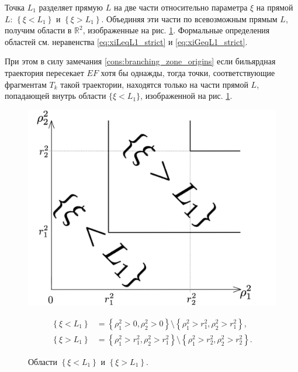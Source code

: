 \medskip

Точка $L_1$ разделяет прямую $L$ на две части относительно параметра $\xi$ на прямой $L$: $\left\{\xi < L_1\right\}$ и $\left\{\xi > L_1\right\}$. 
Объединяя эти части по всевозможным прямым $L$, получим области в $\mathbb{R}^2$, изображенные на  рис. \ref{fig:pt10:_lineDomains_simple}. Формальные определения областей см. неравенства \eqref{eq:xiLeqL1_strict} и \eqref{eq:xiGeqL1_strict}.

При этом в силу замечания \ref{cons:branching_zone_origins} если бильярдная траектория пересекает $EF$ хотя бы однажды, тогда точки, соответствующие фрагментам $T_k$ такой траектории, находятся только на части прямой $L$, попадающей внутрь области $\{ \xi < L_1\}$, изображенной на рис. \ref{fig:pt10:_lineDomains_simple}.

\begin{figure}[!htb]
    \begin{minipage}[c]{0.4\textwidth}
\centering
\includegraphics[scale=0.07]{images/section3_circular/line_domains_simple.pdf}
    \caption{Области $\left\{\xi< L_1\right\}$ и $\left\{\xi > L_1\right\}$.}
    \label{fig:pt10:_lineDomains_simple}
     \end{minipage}
     \begin{minipage}{0.6\textwidth}
\begin{align}
\left\{\xi < L_1 \right\} &=  \left\{\rho_1^2 > 0 , \rho_2^2 > 0 \right\} \setminus \left\{\rho_1^2 > r_1^2 , \rho_2^2 > r_1^2  \right\}, 
\label{eq:xiLeqL1_strict}
\\[15pt]
\left\{\xi > L_1\right\} &= \left\{\rho_1^2 > r_1^2 , \rho_2^2 > r_1^2\right\} \setminus \left\{\rho_1^2 > r_2^2 , \rho_2^2 > r_2^2  \right\}.
\label{eq:xiGeqL1_strict}
\end{align}

    \end{minipage}
\end{figure}

